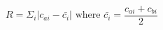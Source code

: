 \documentclass[11pt]{article}
\begin{document}
\thispagestyle{empty}



\[ R = \Sigma_i |c_{ai} - \bar{c_i}| \textrm{ where } \bar{c_i} = \frac{c_{ai} + c_{bi}}{2}\]
\end{document}

